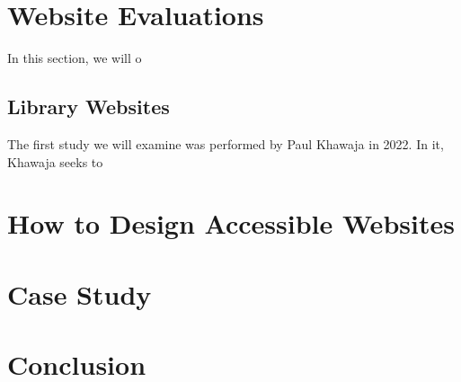 \documentclass{article}
\begin{document}
\section{Website Evaluations}
In this section, we will o


\subsection*{Library Websites}
The first study we will examine was performed by Paul Khawaja in 2022.
\cite{Library}
In it, Khawaja seeks to


\section{How to Design Accessible Websites}


\section{Case Study}


\section{Conclusion}


\small


\end{document}
